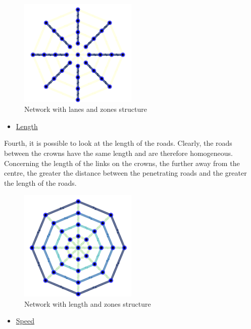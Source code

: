 \documentclass[a4paper, 12pt,oneside]{article}
\begin{document}
\begin{figure}[H]
    \centering
    \includegraphics[width=0.5\textwidth]{Images/capture zone lane.png}
    \caption{Network with lanes and zones structure}
\end{figure}


\begin{itemize}
    \item \underline{Length}
\end{itemize}

Fourth, it is possible to look at the length of the roads. Clearly, the roads between the crowns have the same length and are therefore homogeneous.
Concerning the length of the links on the crowns, the further away from the centre, the greater the distance between the penetrating roads and the greater the length of the roads.

\begin{figure}[H]
    \centering
    \includegraphics[width=0.5\textwidth]{Images/capture zone length.png}
    \caption{Network with length and zones structure}
\end{figure}

\begin{itemize}
    \item \underline{Speed}
\end{itemize}
\end{document}
